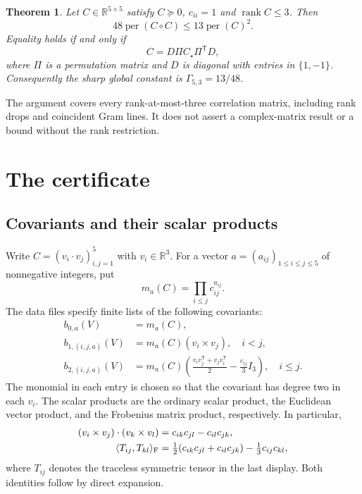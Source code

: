 \documentclass[11pt,a4paper]{article}
\newcommand{\per}{\operatorname{per}}
\newcommand{\rank}{\operatorname{rank}}
\newtheorem{theorem}{Theorem}
\theoremstyle{remark}\newtheorem{remark}[theorem]{Remark}
\begin{document}
\begin{theorem}\label{thm:main}
Let $C\in\mathbb R^{5\times5}$ satisfy $C\succeq0$, $c_{ii}=1$ and $\rank C\leq3$. Then
\begin{equation}\label{eq:main}
 48\per(C\circ C)\leq 13\per(C)^2.
\end{equation}
Equality holds if and only if
\[
 C=D\Pi C_\star\Pi^{\mathsf T}D,
\]
where $\Pi$ is a permutation matrix and $D$ is diagonal with entries in $\{1,-1\}$. Consequently the sharp global constant is $\Gamma_{5,3}=13/48$.
\end{theorem}
The argument covers every rank-at-most-three correlation matrix, including rank drops and coincident Gram lines. It does not assert a complex-matrix result or a bound without the rank restriction.

\section{The certificate}
\subsection{Covariants and their scalar products}
Write $C=(v_i\cdot v_j)_{i,j=1}^5$ with $v_i\in\mathbb R^3$. For a vector $a=(a_{ij})_{1\leq i\leq j\leq5}$ of nonnegative integers, put
\[
 m_a(C)=\prod_{i\leq j}c_{ij}^{a_{ij}}.
\]
The data files specify finite lists of the following covariants:
\begin{align*}
 b_{0,a}(V)&=m_a(C),\\
 b_{1,(i,j,a)}(V)&=m_a(C)(v_i\times v_j),\quad i<j,\\
 b_{2,(i,j,a)}(V)&=m_a(C)\left(\frac{v_iv_j^{\mathsf T}+v_jv_i^{\mathsf T}}2-\frac{c_{ij}}3 I_3\right),\quad i\leq j.
\end{align*}
The monomial in each entry is chosen so that the covariant has degree two in each $v_i$. The scalar products are the ordinary scalar product, the Euclidean vector product, and the Frobenius matrix product, respectively. In particular,
\begin{align}
 (v_i\times v_j)\cdot(v_k\times v_l)
 &=c_{ik}c_{jl}-c_{il}c_{jk},\label{eq:cross}\\
 \langle T_{ij},T_{kl}\rangle_{\rm F}
 &=\tfrac12(c_{ik}c_{jl}+c_{il}c_{jk})-\tfrac13c_{ij}c_{kl},\label{eq:tensor}
\end{align}
where $T_{ij}$ denotes the traceless symmetric tensor in the last display. Both identities follow by direct expansion.
\end{document}
